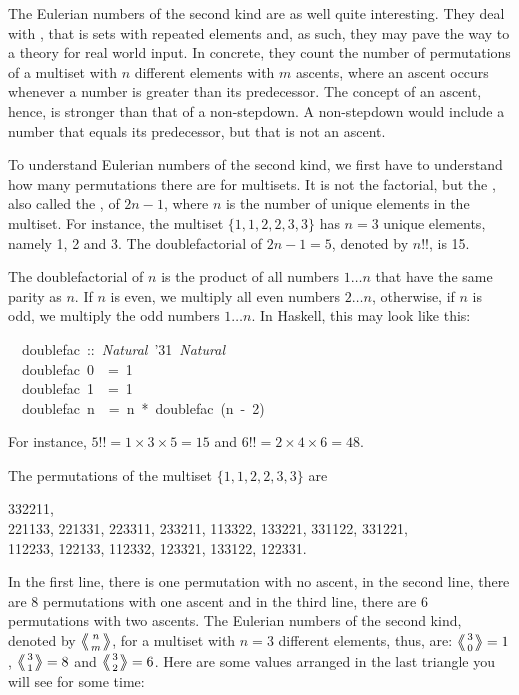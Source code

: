 \documentclass{scrreprt}
\newcommand{\texfamily}{\fontfamily{cmtex}\selectfont}
\begin{document}
The Eulerian numbers of the second kind 
are as well quite interesting. They deal
with , that is sets with
repeated elements and, as such, they
may pave the way to a theory for real world input.
In concrete, they count the number of permutations
of a multiset with $n$ different elements
with $m$ ascents, where an ascent occurs
whenever a number is greater than its predecessor.
The concept of an ascent, hence, is stronger
than that of a non-stepdown. A non-stepdown
would include a number that equals its predecessor,
but that is not an ascent.

To understand Eulerian numbers of the second kind,
we first have to understand how many permutations
there are for multisets. It is not the factorial,
but the , also called the
, of $2n-1$, where $n$ is the number of unique
elements in the multiset.
For instance, the multiset $\lbrace 1,1,2,2,3,3\rbrace$
has $n=3$ unique elements, namely 1, 2 and 3.
The doublefactorial of $2n-1 = 5$, denoted by $n!!$, is 15.

The doublefactorial of $n$ is the product of all numbers
$1\dots n$ that have the same parity as $n$.
If $n$ is even, we multiply all even numbers $2\dots n$,
otherwise, if $n$ is odd, we multiply the odd numbers
$1\dots n$. In Haskell, this may look like this:

\begin{minipage}{\textwidth}\begin{tabbing}\texfamily
~~doublefac~::~{\itshape Natural}~\char'31~{\itshape Natural}\\
\texfamily ~~doublefac~0~~=~1\\
\texfamily ~~doublefac~1~~=~1\\
\texfamily ~~doublefac~n~~=~n~*~doublefac~(n~-~2)
\end{tabbing}
\end{minipage}

For instance, $5!! = 1 \times 3 \times 5 = 15$
and $6!! = 2 \times 4 \times 6 = 48$.

The permutations of the multiset $\lbrace 1,1,2,2,3,3\rbrace$ are

332211,\\
221133, 221331, 223311, 233211, 113322, 133221, 331122, 331221,\\
112233, 122133, 112332, 123321, 133122, 122331.

In the first line, there is one permutation
with no ascent,
in the second line, there are 8 permutations
with one ascent and
in the third line, there are 6 permutations
with two ascents.
The Eulerian numbers of the second kind,
denoted by $\left\langle\!\!\left\langle{n \atop m}\right\rangle\!\!\right\rangle$, for a multiset
with $n=3$ different elements, thus, are:
$\left\langle\!\!\left\langle{3 \atop 0}\right\rangle\!\!\right\rangle = 1$,
$\left\langle\!\!\left\langle{3 \atop 1}\right\rangle\!\!\right\rangle = 8$ and
$\left\langle\!\!\left\langle{3 \atop 2}\right\rangle\!\!\right\rangle = 6$.
Here are some values arranged in 
the last triangle you will see for some time:
\end{document}
